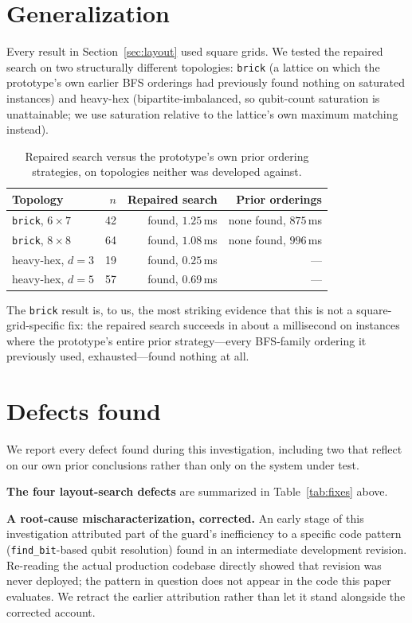 \documentclass[11pt]{article}
\begin{document}
\section{Generalization}
\label{sec:generalization}

Every result in Section~\ref{sec:layout} used square grids. We tested
the repaired search on two structurally different topologies:
\texttt{brick} (a lattice on which the prototype's own earlier BFS
orderings had previously found nothing on saturated instances) and
heavy-hex (bipartite-imbalanced, so qubit-count saturation is
unattainable; we use saturation relative to the lattice's own maximum
matching instead).

\begin{table}[h]
\centering
\begin{tabular}{lrrr}
\toprule
Topology & $n$ & Repaired search & Prior orderings \\
\midrule
\texttt{brick}, $6\times7$ & 42 & found, $1.25$\,ms & none found, $875$\,ms \\
\texttt{brick}, $8\times8$ & 64 & found, $1.08$\,ms & none found, $996$\,ms \\
heavy-hex, $d{=}3$ & 19 & found, $0.25$\,ms & --- \\
heavy-hex, $d{=}5$ & 57 & found, $0.69$\,ms & --- \\
\bottomrule
\end{tabular}
\caption{Repaired search versus the prototype's own prior ordering
strategies, on topologies neither was developed against.}
\label{tab:generalization}
\end{table}

The \texttt{brick} result is, to us, the most striking evidence that
this is not a square-grid-specific fix: the repaired search succeeds in
about a millisecond on instances where the prototype's entire prior
strategy---every BFS-family ordering it previously used, exhausted---found
nothing at all.

\section{Defects found}
\label{sec:defects}

We report every defect found during this investigation, including two
that reflect on our own prior conclusions rather than only on the
system under test.

\textbf{The four layout-search defects} are summarized in
Table~\ref{tab:fixes} above.

\textbf{A root-cause mischaracterization, corrected.} An early stage of
this investigation attributed part of the guard's inefficiency to a
specific code pattern (\texttt{find\_bit}-based qubit resolution) found
in an intermediate development revision. Re-reading the actual
production codebase directly showed that revision was never deployed;
the pattern in question does not appear in the code this paper
evaluates. We retract the earlier attribution rather than let it stand
alongside the corrected account.
\end{document}
